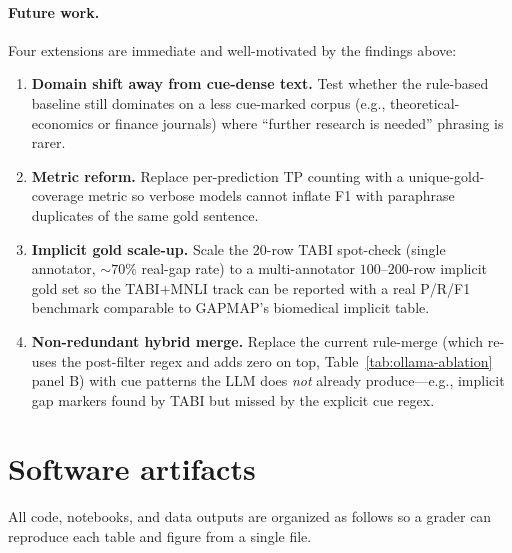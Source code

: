 \documentclass{article}
\begin{document}
\paragraph{Future work.} Four extensions are immediate and well-motivated by the findings above:
\begin{enumerate}
  \item \textbf{Domain shift away from cue-dense text.} Test whether the rule-based baseline still dominates on a less cue-marked corpus (e.g., theoretical-economics or finance journals) where ``further research is needed'' phrasing is rarer.
  \item \textbf{Metric reform.} Replace per-prediction TP counting with a unique-gold-coverage metric so verbose models cannot inflate F1 with paraphrase duplicates of the same gold sentence.
  \item \textbf{Implicit gold scale-up.} Scale the 20-row TABI spot-check (single annotator, $\sim 70\%$ real-gap rate) to a multi-annotator $100$--$200$-row implicit gold set so the TABI$+$MNLI track can be reported with a real P/R/F1 benchmark comparable to GAPMAP's biomedical implicit table.
  \item \textbf{Non-redundant hybrid merge.} Replace the current rule-merge (which re-uses the post-filter regex and adds zero on top, Table~\ref{tab:ollama-ablation} panel B) with cue patterns the LLM does \emph{not} already produce---e.g., implicit gap markers found by TABI but missed by the explicit cue regex.
\end{enumerate}

\section*{Software artifacts}
\noindent All code, notebooks, and data outputs are organized as follows so a grader can reproduce each table and figure from a single file.
\end{document}
